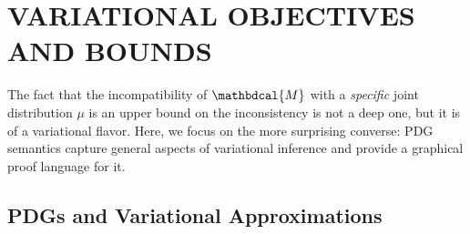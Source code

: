 \documentclass[twoside]{article}
\theoremstyle{plain}
\theoremstyle{definition}
\newcommand{\dg}[1]{\mathbdcal{#1}}
\begin{document}
\section{VARIATIONAL OBJECTIVES AND BOUNDS}
\label{sec:theory}

%

The fact that the incompatibility of $\dg M$ with a \emph{specific} joint distribution $\mu$ is an upper bound on the inconsistency is not a deep one, but it is of a variational flavor.
Here, we focus on the more surprising converse:  PDG semantics capture general aspects of variational inference and provide
a graphical proof language for it.

\subsection{PDGs and Variational Approximations}
\label{sec:variational}
\end{document}
